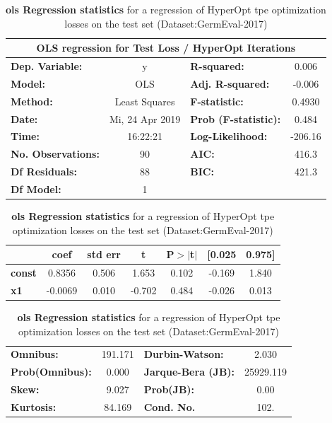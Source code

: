 \begin{table}[H]
	\begin{center}
		\begin{tabular}{lclc}
		\toprule
		\multicolumn{4}{c}{OLS regression for Test Loss / HyperOpt Iterations} \\
		\midrule
		\textbf{Dep. Variable:}    &        y        & \textbf{  R-squared:        } &     0.006   \\
		\textbf{Model:}            &       OLS       & \textbf{  Adj. R-squared:   } &    -0.006   \\
		\textbf{Method:}           &  Least Squares  & \textbf{  F-statistic:      } &    0.4930   \\
		\textbf{Date:}             & Mi, 24 Apr 2019 & \textbf{  Prob (F-statistic):} &    0.484    \\
		\textbf{Time:}             &     16:22:21    & \textbf{  Log-Likelihood:   } &   -206.16   \\
		\textbf{No. Observations:} &          90     & \textbf{  AIC:              } &     416.3   \\
		\textbf{Df Residuals:}     &          88     & \textbf{  BIC:              } &     421.3   \\
		\textbf{Df Model:}         &           1     & \textbf{                     } &             \\
		\bottomrule
		\end{tabular}
		\begin{tabular}{lcccccc}
					& \textbf{coef} & \textbf{std err} & \textbf{t} & \textbf{P$>$$|$t$|$} & \textbf{[0.025} & \textbf{0.975]}  \\
		\midrule
		\textbf{const} &       0.8356  &        0.506     &     1.653  &         0.102        &       -0.169    &        1.840     \\
		\textbf{x1}    &      -0.0069  &        0.010     &    -0.702  &         0.484        &       -0.026    &        0.013     \\
		\bottomrule
		\end{tabular}
		\begin{tabular}{lclc}
		\textbf{Omnibus:}       & 191.171 & \textbf{  Durbin-Watson:    } &     2.030  \\
		\textbf{Prob(Omnibus):} &   0.000 & \textbf{  Jarque-Bera (JB): } & 25929.119  \\
		\textbf{Skew:}          &   9.027 & \textbf{  Prob(JB):         } &      0.00  \\
		\textbf{Kurtosis:}      &  84.169 & \textbf{  Cond. No.          } &      102.  \\
		\bottomrule
		\end{tabular}
	\end{center}
	\caption{\textbf{\gls{ols} Regression statistics} for a regression of HyperOpt \gls{tpe} optimization losses on the test set {(Dataset:GermEval-2017)}}
	\label{tab:08_olsLossItTest}	
\end{table}

